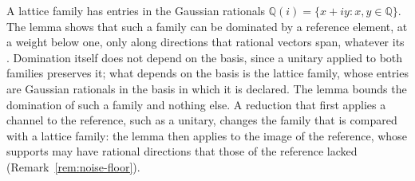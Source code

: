 
A lattice family has entries in the Gaussian rationals
$\mathbb{Q}(i)=\{x+iy:x,y\in\mathbb{Q}\}$. The lemma shows that such a family
can be dominated by a reference element, at a weight below one, only along
directions that rational vectors span, whatever its .
Domination itself does not depend on the basis, since a unitary applied to
both families preserves it; what depends on the basis is the lattice family,
whose entries are Gaussian rationals in the basis in which it is declared.
The lemma bounds the domination of such a family and nothing else. A
reduction that first applies a channel to the reference, such as a unitary,
changes the family that is compared with a lattice family: the lemma then
applies to the image of the reference, whose supports may have rational
directions that those of the reference lacked
(Remark~\ref{rem:noise-floor}).

